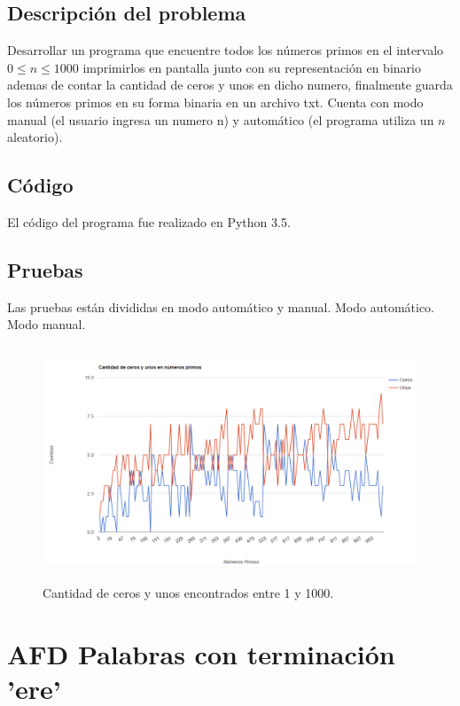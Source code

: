 \documentclass[12pt, titlepage]{article}
\begin{document}
	\subsection{Descripción del problema}
	Desarrollar un programa que encuentre todos los números primos en el intervalo $0 \leq n \leq 1000$ imprimirlos en pantalla junto con su representación en binario ademas de contar la cantidad de ceros y unos en dicho numero, finalmente guarda los números primos en su forma binaria en un archivo txt.
	Cuenta con modo manual (el usuario ingresa un numero n) y automático (el programa utiliza un $n$ aleatorio).
	\subsection{Código}
	El código del programa fue realizado en Python 3.5.
	\subsection{Pruebas}
	Las pruebas están divididas en modo automático y manual.
	{\large Modo automático.}
	{\large Modo manual.}
	\begin{figure}[ht]
		\begin{center}
			\includegraphics[width=\linewidth, height=7cm]{img/primos.png}
			\caption{Cantidad de ceros y unos encontrados entre 1 y 1000.}
			\label{fig:grafica}
		\end{center}
	\end{figure}
	
	\section{AFD Palabras con terminación 'ere'}
\end{document}
